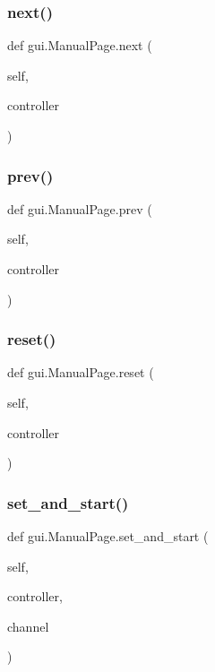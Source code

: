 \subsubsection{\texorpdfstring{next()}{next()}}
{\footnotesize\ttfamily def gui.\+Manual\+Page.\+next (\begin{DoxyParamCaption}\item[{}]{self,  }\item[{}]{controller }\end{DoxyParamCaption})}

\mbox{\label{classgui_1_1_manual_page_a57e9ed5a1ee1d6e3bcecc7715d266e51}} 
\subsubsection{\texorpdfstring{prev()}{prev()}}
{\footnotesize\ttfamily def gui.\+Manual\+Page.\+prev (\begin{DoxyParamCaption}\item[{}]{self,  }\item[{}]{controller }\end{DoxyParamCaption})}

\mbox{\label{classgui_1_1_manual_page_afd759af883bbbc147da7af8193f680fb}} 
\subsubsection{\texorpdfstring{reset()}{reset()}}
{\footnotesize\ttfamily def gui.\+Manual\+Page.\+reset (\begin{DoxyParamCaption}\item[{}]{self,  }\item[{}]{controller }\end{DoxyParamCaption})}

\mbox{\label{classgui_1_1_manual_page_abee62c1ff09ba1b65405cebc5da5e013}} 
\subsubsection{\texorpdfstring{set\_and\_start()}{set\_and\_start()}}
{\footnotesize\ttfamily def gui.\+Manual\+Page.\+set\+\_\+and\+\_\+start (\begin{DoxyParamCaption}\item[{}]{self,  }\item[{}]{controller,  }\item[{}]{channel }\end{DoxyParamCaption})}

